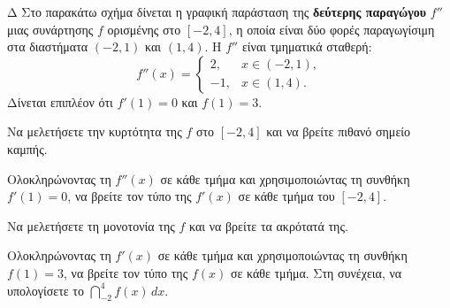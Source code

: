 
\begin{thema}{Δ}
Στο παρακάτω σχήμα δίνεται η γραφική παράσταση της \textbf{δεύτερης παραγώγου} $f''$ μιας συνάρτησης $f$ ορισμένης στο $[-2, 4]$, η οποία είναι δύο φορές παραγωγίσιμη στα διαστήματα $(-2,1)$ και $(1,4)$. Η $f''$ είναι τμηματικά σταθερή:
\[
f''(x)=
\begin{cases}
2, & x \in (-2,1),\\
-1, & x \in (1,4).
\end{cases}
\]
Δίνεται επιπλέον ότι $f'(1) = 0$ και $f(1) = 3$.

\begin{center}
\end{center}

\begin{erwthma}
  \item Να μελετήσετε την κυρτότητα της $f$ στο $[-2, 4]$ και να βρείτε πιθανό σημείο καμπής.
  \item Ολοκληρώνοντας τη $f''(x)$ σε κάθε τμήμα και χρησιμοποιώντας τη συνθήκη $f'(1) = 0$, να βρείτε τον τύπο της $f'(x)$ σε κάθε τμήμα του $[-2, 4]$.
  \item Να μελετήσετε τη μονοτονία της $f$ και να βρείτε τα ακρότατά της.
  \item Ολοκληρώνοντας τη $f'(x)$ σε κάθε τμήμα και χρησιμοποιώντας τη συνθήκη $f(1) = 3$, να βρείτε τον τύπο της $f(x)$ σε κάθε τμήμα. Στη συνέχεια, να υπολογίσετε το $\displaystyle\dint_{-2}^{4} f(x)\,dx$.
\end{erwthma}
\end{thema}

